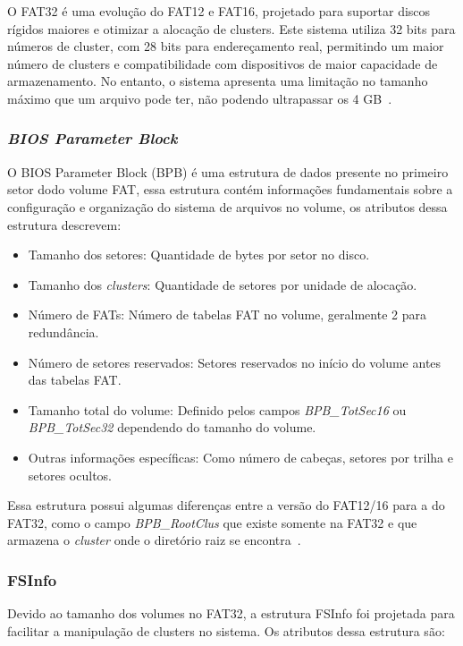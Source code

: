 \documentclass[
    12pt,				%
    oneside,   	        %
    a4paper,			%
    english,			%
    french,				%
    spanish,			%
    brazil,				%
    ]{pacotes/abntex2}
\begin{document}
O FAT32 é uma evolução do FAT12 e FAT16, projetado para suportar discos rígidos maiores e otimizar a alocação de clusters. Este sistema utiliza 32 bits para números de cluster, com 28 bits para endereçamento real, permitindo um maior número de clusters e compatibilidade com dispositivos de maior capacidade de armazenamento. No entanto, o sistema apresenta uma limitação no tamanho máximo que um arquivo pode ter, não podendo ultrapassar os 4 GB~\cite{osdev}.

\subsubsection{\textit{BIOS Parameter Block}}
\label{subsubsec:bpb}

O BIOS Parameter Block (BPB) é uma estrutura de dados presente no primeiro setor dodo volume FAT, essa estrutura contém informações fundamentais sobre a configuração e organização do sistema de arquivos no volume, os atributos dessa estrutura descrevem:

\begin{itemize}
    \item Tamanho dos setores: Quantidade de bytes por setor no disco.
    \item Tamanho dos \textit{clusters}: Quantidade de setores por unidade de alocação.
    \item Número de FATs: Número de tabelas FAT no volume, geralmente 2 para redundância.
    \item Número de setores reservados: Setores reservados no início do volume antes das tabelas FAT.
    \item Tamanho total do volume: Definido pelos campos \textit{BPB\_TotSec16} ou \textit{BPB\_TotSec32} dependendo do tamanho do volume.
    \item Outras informações específicas: Como número de cabeças, setores por trilha e setores ocultos.
\end{itemize}

Essa estrutura possui algumas diferenças entre a versão do FAT12/16 para a do FAT32, como o campo \textit{BPB\_RootClus} que existe somente na FAT32 e que armazena o \textit{cluster} onde o diretório raiz se encontra~\cite{microsoft2000}.

\subsubsection{FSInfo}
\label{subsubsec:fsinfo}

Devido ao tamanho dos volumes no FAT32, a estrutura FSInfo foi projetada para facilitar a manipulação de clusters no sistema. Os atributos dessa estrutura são:
\end{document}

